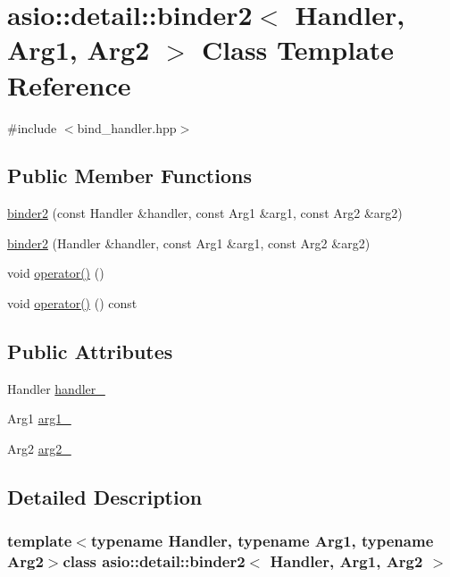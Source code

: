 \hypertarget{classasio_1_1detail_1_1binder2}{}\section{asio\+:\+:detail\+:\+:binder2$<$ Handler, Arg1, Arg2 $>$ Class Template Reference}
\label{classasio_1_1detail_1_1binder2}


{\ttfamily \#include $<$bind\+\_\+handler.\+hpp$>$}

\subsection*{Public Member Functions}
\begin{DoxyCompactItemize}
\item 
\hyperlink{classasio_1_1detail_1_1binder2_a3356853000163531f1924b04350be3cc}{binder2} (const Handler \&handler, const Arg1 \&arg1, const Arg2 \&arg2)
\item 
\hyperlink{classasio_1_1detail_1_1binder2_a8812e71f6a4121bd57887fe2928c1160}{binder2} (Handler \&handler, const Arg1 \&arg1, const Arg2 \&arg2)
\item 
void \hyperlink{classasio_1_1detail_1_1binder2_a10f8214abd05320d39a1b8338cb9f725}{operator()} ()
\item 
void \hyperlink{classasio_1_1detail_1_1binder2_a01c508a10a465d8be8792a8f81eb2b1b}{operator()} () const 
\end{DoxyCompactItemize}
\subsection*{Public Attributes}
\begin{DoxyCompactItemize}
\item 
Handler \hyperlink{classasio_1_1detail_1_1binder2_a1443f32c77da165b216af1d1ae7a42fd}{handler\+\_\+}
\item 
Arg1 \hyperlink{classasio_1_1detail_1_1binder2_ad03c34f96ee8956653cb24dc56ecead4}{arg1\+\_\+}
\item 
Arg2 \hyperlink{classasio_1_1detail_1_1binder2_a4e200aef85dfd3813938c5e3364cdd2e}{arg2\+\_\+}
\end{DoxyCompactItemize}


\subsection{Detailed Description}
\subsubsection*{template$<$typename Handler, typename Arg1, typename Arg2$>$class asio\+::detail\+::binder2$<$ Handler, Arg1, Arg2 $>$}



